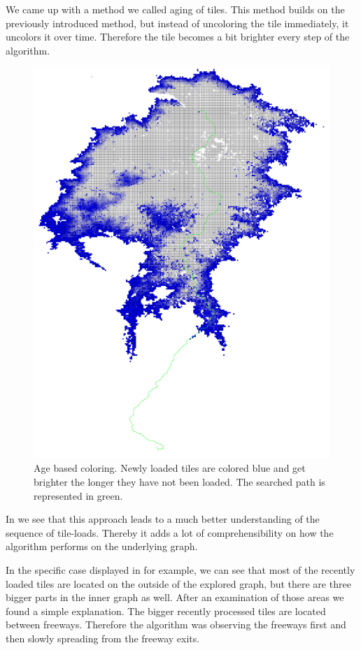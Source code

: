 \documentclass
[
    paper = a4,
    pagesize,
    12 pt,
    oneside,                       %
    open = right,
    DIV = calc,
    BCOR = 0 mm,                   %
    bibtotoc
]
{scrbook}
\begin{document}
We came up with a method we called aging of tiles.
This method builds on the previously introduced method, but instead of uncoloring the tile immediately, it uncolors it over time.
Therefore the tile becomes a bit brighter every step of the algorithm.

\begin{figure}
    \includegraphics[width=\textwidth]{Images/vis-aged-coloring.png}
\caption[]{Age based coloring. Newly loaded tiles are colored blue and get brighter the longer they have not been loaded. The searched path is represented in green.}
\label{fig:color_aged_tile}
\end{figure}

In  we see that this approach leads to a much better understanding of the sequence of tile-loads.
Thereby it adds a lot of comprehensibility on how the algorithm performs on the underlying graph.

In the specific case displayed in  for example, we can see that most of the recently loaded tiles are located on the outside of the explored graph, but there are three bigger parts in the inner graph as well.
After an examination of those areas we found a simple explanation.
The bigger recently processed tiles are located between freeways.
Therefore the algorithm was observing the freeways first and then slowly spreading from the freeway exits.
\end{document}
